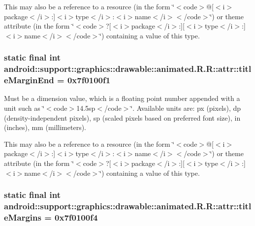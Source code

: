 This may also be a reference to a resource (in the form \char`\"{}$<$code$>$@\mbox{[}$<$i$>$package$<$/i$>$:\mbox{]}$<$i$>$type$<$/i$>$:$<$i$>$name$<$/i$>$$<$/code$>$\char`\"{}) or theme attribute (in the form \char`\"{}$<$code$>$?\mbox{[}$<$i$>$package$<$/i$>$:\mbox{]}\mbox{[}$<$i$>$type$<$/i$>$:\mbox{]}$<$i$>$name$<$/i$>$$<$/code$>$\char`\"{}) containing a value of this type. \hypertarget{classandroid_1_1support_1_1graphics_1_1drawable_1_1animated_1_1_r_1_1attr_2245b8d9993100cb8f3c85ddc3abbfe2}{
\subsubsection[{titleMarginEnd}]{\setlength{\rightskip}{0pt plus 5cm}static final int android::support::graphics::drawable::animated.R.R::attr::titleMarginEnd = 0x7f0100f1}}
\label{classandroid_1_1support_1_1graphics_1_1drawable_1_1animated_1_1_r_1_1attr_2245b8d9993100cb8f3c85ddc3abbfe2}


Must be a dimension value, which is a floating point number appended with a unit such as \char`\"{}$<$code$>$14.5sp$<$/code$>$\char`\"{}. Available units are: px (pixels), dp (density-independent pixels), sp (scaled pixels based on preferred font size), in (inches), mm (millimeters). 

This may also be a reference to a resource (in the form \char`\"{}$<$code$>$@\mbox{[}$<$i$>$package$<$/i$>$:\mbox{]}$<$i$>$type$<$/i$>$:$<$i$>$name$<$/i$>$$<$/code$>$\char`\"{}) or theme attribute (in the form \char`\"{}$<$code$>$?\mbox{[}$<$i$>$package$<$/i$>$:\mbox{]}\mbox{[}$<$i$>$type$<$/i$>$:\mbox{]}$<$i$>$name$<$/i$>$$<$/code$>$\char`\"{}) containing a value of this type. \hypertarget{classandroid_1_1support_1_1graphics_1_1drawable_1_1animated_1_1_r_1_1attr_02057117a470ff7259390d351cb8059c}{
\subsubsection[{titleMargins}]{\setlength{\rightskip}{0pt plus 5cm}static final int android::support::graphics::drawable::animated.R.R::attr::titleMargins = 0x7f0100f4}}
\label{classandroid_1_1support_1_1graphics_1_1drawable_1_1animated_1_1_r_1_1attr_02057117a470ff7259390d351cb8059c}


